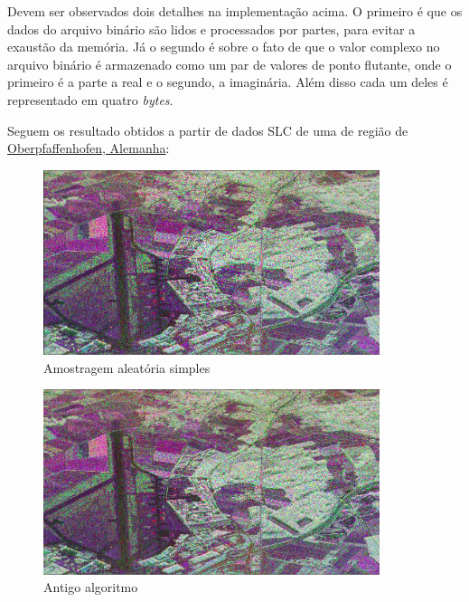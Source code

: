 \documentclass[12pt]{article}
\begin{document}
Devem ser observados dois detalhes na implementação acima. O primeiro é que os dados do arquivo binário são lidos e processados por partes, para evitar a exaustão da memória. Já o segundo é sobre o fato de que o valor complexo no arquivo binário é armazenado como um par de valores de ponto flutante, onde o primeiro é a parte a real e o segundo, a imaginária. Além disso cada um deles é representado em quatro \textit{bytes}.

Seguem os resultado obtidos a partir de dados SLC de uma de região de \href{https://earth.esa.int/web/polsarpro/data-sources/sample-datasets#ESAR}{Oberpfaffenhofen, Alemanha}:

\begin{figure}[!ht]
	\begin{center}
        \includegraphics[width = 98.5mm, scale = 0.5]{../../Images/Report_08_18/oberpfaffenhofen_simple_random_sample_reduced} \\ 
        Amostragem aleatória simples\\
	\end{center}
\end{figure}

\begin{figure}[!ht]
	\begin{center}    
		\includegraphics[width = 98.5mm, scale = 0.5]{../../Images/Report_08_18/oberpfaffenhofen_trad_algorithm_reduced} \\ 
        Antigo algoritmo\\
	\end{center}
\end{figure}
\end{document}

